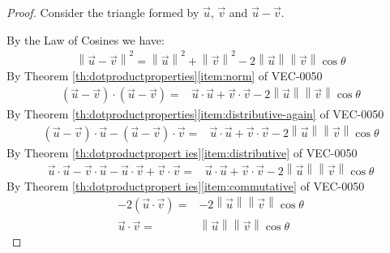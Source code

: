 \documentclass{ximera}
\newcommand\norm[1]{\left\lVert#1\right\rVert}
\begin{document}
\begin{proof} Consider the triangle formed by $\vec{u}$, $\vec{v}$ and $\vec{u}-\vec{v}$. 

\begin{image}[2in]
\end{image}

By the Law of Cosines we have:
\begin{align*}
\norm{\vec{u}-\vec{v}}^2=\norm{\vec{u}}^2+\norm{\vec{v}}^2-2\norm{\vec{u}}\norm{\vec{v}}\cos\theta
\end{align*}
By Theorem \ref{th:dotproductproperties}\ref{item:norm} of VEC-0050
\begin{align*}
(\vec{u}-\vec{v})\cdot (\vec{u}-\vec{v})=&\vec{u}\cdot \vec{u}+\vec{v}\cdot \vec{v}-2\norm{\vec{u}}\norm{\vec{v}}\cos\theta
\end{align*}
By Theorem \ref{th:dotproductproperties}\ref{item:distributive-again} of VEC-0050
\begin{align*}
(\vec{u}-\vec{v})\cdot \vec{u}-(\vec{u}-\vec{v})\cdot \vec{v}=&\vec{u}\cdot \vec{u}+\vec{v}\cdot \vec{v}-2\norm{\vec{u}}\norm{\vec{v}}\cos\theta
\end{align*}
By Theorem \ref{th:dotproductpropert ies}\ref{item:distributive} of VEC-0050
\begin{align*}
\vec{u}\cdot \vec{u}-\vec{v}\cdot\vec{u}-\vec{u}\cdot\vec{v}+\vec{v}\cdot \vec{v}=&\vec{u}\cdot \vec{u}+\vec{v}\cdot \vec{v}-2\norm{\vec{u}}\norm{\vec{v}}\cos\theta
\end{align*}
By Theorem \ref{th:dotproductpropert ies}\ref{item:commutative} of VEC-0050
\begin{align*}
-2(\vec{u}\cdot \vec{v})=&-2\norm{\vec{u}}\norm{\vec{v}}\cos\theta\\
\vec{u}\cdot \vec{v}=&\norm{\vec{u}}\norm{\vec{v}}\cos\theta
\end{align*}
\end{proof}
\end{document}
